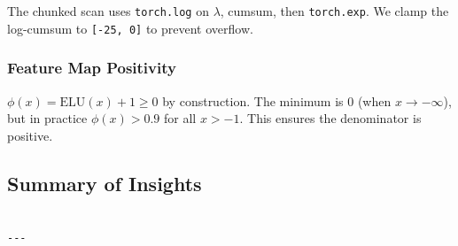 The chunked scan uses \texttt{torch.log} on $\lambda$, cumsum, then \texttt{torch.exp}. 
We clamp the log-cumsum to \texttt{[-25, 0]} to prevent overflow.

\subsubsection{Feature Map Positivity}

$\phi(x) = \text{ELU}(x) + 1 \geq 0$ by construction. The minimum is 
$0$ (when $x \to -\infty$), but in practice $\phi(x) > 0.9$ for all 
$x > -1$. This ensures the denominator is positive.

\subsection{Summary of Insights}

\begin{lstlisting}

---
\end{lstlisting}